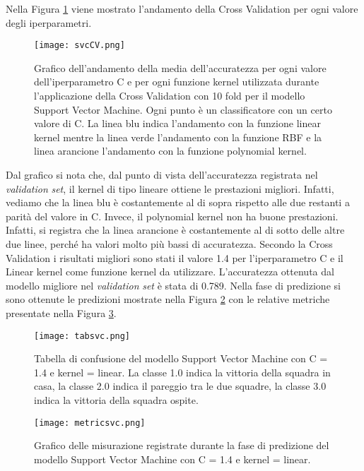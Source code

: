 Nella Figura \ref{fig:svcCV} viene mostrato l'andamento della Cross Validation per ogni valore degli iperparametri.
\begin{figure}[]
	\begin{center}
		\texttt{[image: svcCV.png]}
		\caption{Grafico dell'andamento della media dell'accuratezza per ogni valore dell'iperparametro C e per ogni funzione kernel utilizzata durante l'applicazione della Cross Validation con 10 fold per il modello Support Vector Machine. Ogni punto è un classificatore con un certo valore di C. La linea blu indica l'andamento con la funzione linear kernel mentre la linea verde l'andamento con la funzione RBF e	la linea arancione l'andamento con la funzione polynomial kernel.
		} 
		\label{fig:svcCV}
	\end{center}
\end{figure}
Dal grafico si nota che, dal punto di vista dell'accuratezza registrata nel \emph{validation} \emph{set}, il kernel di tipo lineare ottiene le prestazioni migliori. Infatti, vediamo che la linea blu è costantemente al di sopra rispetto alle due restanti a parità del valore in \textsf{C}. Invece, il polynomial kernel non ha buone prestazioni. Infatti, si registra che la linea arancione è costantemente al di sotto delle altre due linee, perché ha valori molto più bassi di accuratezza. Secondo la Cross Validation i risultati migliori sono stati il valore 1.4 per l'iperparametro \textsf{C} e il Linear kernel come funzione \textsf{kernel} da utilizzare. L'accuratezza ottenuta dal modello migliore nel \emph{validation} \emph{set} è stata di 0.789. Nella fase di predizione si sono ottenute le predizioni mostrate nella Figura \ref{fig:tabsvc} con le relative metriche presentate nella Figura \ref{fig:svcmetrics}.
\begin{figure}[]
	\begin{center}
		\texttt{[image: tabsvc.png]}
		\caption{Tabella di confusione del modello Support Vector Machine con \textsf{C} = 1.4 e \textsf{kernel} = linear. La classe 1.0 indica la vittoria della squadra in casa, la classe 2.0 indica il pareggio tra le due squadre, la classe 3.0 indica la vittoria della squadra ospite.
		} 
		\label{fig:tabsvc}
	\end{center}
\end{figure}
\begin{figure}[]
	\begin{center}
		\texttt{[image: metricsvc.png]}
		\caption{Grafico delle misurazione registrate durante la fase di predizione del modello Support Vector Machine con \textsf{C} = 1.4 e \textsf{kernel} = linear.
		} 
		\label{fig:svcmetrics}
	\end{center}
\end{figure}
